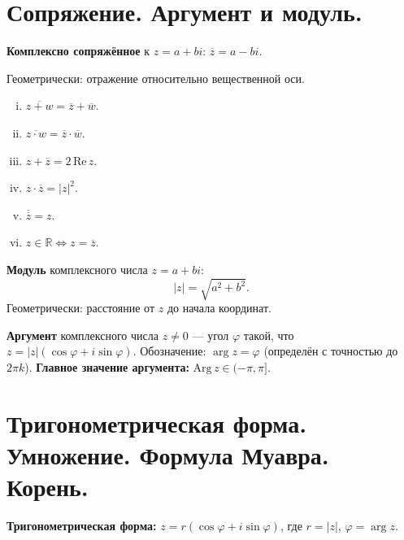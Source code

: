 \documentclass[12pt]{article}
\begin{document}
\section{Сопряжение. Аргумент и модуль.}

\begin{definition}
\textbf{Комплексно сопряжённое} к $z = a+bi$:
$\overline{z} = a - bi$.

Геометрически: отражение относительно вещественной оси.
\end{definition}

\begin{property}
\begin{enumerate}[(i)]
\item $\overline{z+w} = \overline{z} + \overline{w}$.
\item $\overline{z \cdot w} = \overline{z} \cdot \overline{w}$.
\item $z + \overline{z} = 2\,\mathrm{Re}\,z$.
\item $z \cdot \overline{z} = |z|^2$.
\item $\overline{\overline{z}} = z$.
\item $z \in \mathbb{R} \iff z = \overline{z}$.
\end{enumerate}
\end{property}

\begin{definition}
\textbf{Модуль} комплексного числа $z = a+bi$:
\[
|z| = \sqrt{a^2 + b^2}.
\]
Геометрически: расстояние от $z$ до начала координат.
\end{definition}

\begin{definition}
\textbf{Аргумент} комплексного числа $z \neq 0$ ---
угол $\varphi$ такой, что $z = |z|(\cos\varphi + i\sin\varphi)$.
Обозначение: $\arg z = \varphi$ (определён с точностью до $2\pi k$).
\textbf{Главное значение аргумента:} $\mathrm{Arg}\,z \in (-\pi, \pi]$.
\end{definition}

\section{Тригонометрическая форма. Умножение. Формула Муавра. Корень.}

\begin{definition}
\textbf{Тригонометрическая форма:} $z = r(\cos\varphi + i\sin\varphi)$,
где $r = |z|$, $\varphi = \arg z$.
\end{definition}
\end{document}
